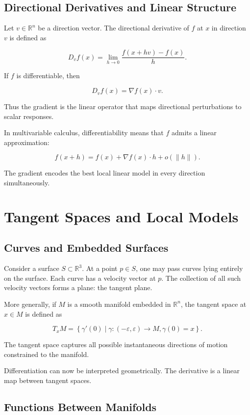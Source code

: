 \documentclass[12pt]{book}
\begin{document}
\section{Directional Derivatives and Linear Structure}

Let $v \in \mathbb{R}^n$ be a direction vector. The directional derivative of $f$ at $x$ in direction $v$ is defined as

\[
D_v f(x) = \lim_{h \to 0} \frac{f(x + hv) - f(x)}{h}.
\]

If $f$ is differentiable, then

\[
D_v f(x) = \nabla f(x) \cdot v.
\]

Thus the gradient is the linear operator that maps directional perturbations to scalar responses.

In multivariable calculus, differentiability means that $f$ admits a linear approximation:

\[
f(x + h) = f(x) + \nabla f(x) \cdot h + o(\|h\|).
\]

The gradient encodes the best local linear model in every direction simultaneously.

\chapter{Tangent Spaces and Local Models}

\section{Curves and Embedded Surfaces}

Consider a surface $S \subset \mathbb{R}^3$. At a point $p \in S$, one may pass curves lying entirely on the surface. Each curve has a velocity vector at $p$. The collection of all such velocity vectors forms a plane: the tangent plane.

More generally, if $M$ is a smooth manifold embedded in $\mathbb{R}^n$, the tangent space at $x \in M$ is defined as

\[
T_x M = \left\{ \gamma'(0) \mid \gamma : (-\varepsilon, \varepsilon) \to M, \gamma(0)=x \right\}.
\]

The tangent space captures all possible instantaneous directions of motion constrained to the manifold.

Differentiation can now be interpreted geometrically. The derivative is a linear map between tangent spaces.

\section{Functions Between Manifolds}
\end{document}
